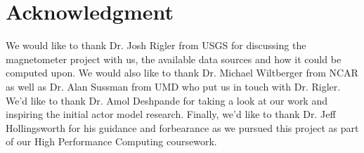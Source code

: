 \documentclass[conference,twocolumn,10pt]{IEEEtran}
\begin{document}


\section*{Acknowledgment}
We would like to thank Dr. Josh Rigler from USGS for discussing the magnetometer project with us, the available data sources and how it could be computed upon. We would also like to thank Dr. Michael Wiltberger from NCAR as well as Dr. Alan Sussman from UMD who put us in touch with Dr. Rigler. We'd like to thank Dr. Amol Deshpande for taking a look at our work and inspiring the initial actor model research. Finally, we'd like to thank Dr. Jeff Hollingsworth for his guidance and forbearance as we pursued this project as part of our High Performance Computing coursework.






\end{document}
